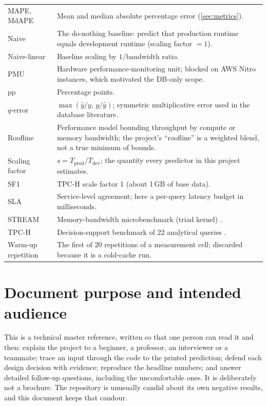 \begin{longtable}{@{}L{2.6cm}L{12.3cm}@{}}
MAPE, MdAPE & Mean and median absolute percentage error (\cref{sec:metrics}).\\
Naive & The do-nothing baseline: predict that production runtime equals development runtime (scaling factor $=1$).\\
Naive-linear & Baseline scaling by $1/\text{bandwidth ratio}$.\\
PMU & Hardware performance-monitoring unit; blocked on AWS Nitro instances, which motivated the DB-only scope.\\
pp & Percentage points.\\
$q$-error & $\max(\hat y/y,\,y/\hat y)$; symmetric multiplicative error used in the database literature.\\
Roofline & Performance model bounding throughput by compute or memory bandwidth; the project's ``roofline'' is a weighted blend, not a true minimum of bounds.\\
Scaling factor & $s = T_{\text{prod}}/T_{\text{dev}}$; the quantity every predictor in this project estimates.\\
SF1 & TPC-H scale factor 1 (about 1\,GB of base data).\\
SLA & Service-level agreement; here a per-query latency budget in milliseconds.\\
STREAM & Memory-bandwidth microbenchmark (triad kernel) \citep{mccalpin:stream}.\\
TPC-H & Decision-support benchmark of 22 analytical queries \citep{tpch:spec}.\\
Warm-up repetition & The first of 20 repetitions of a measurement cell; discarded because it is a cold-cache run.\\
\bottomrule
\end{longtable}
\normalsize

\setcounter{page}{1}
\chapter*{Document purpose and intended audience}

This is a technical master reference, written so that one person can read it and then:
explain the project to a beginner, a professor, an interviewer or a teammate; trace an input through the
code to the printed prediction; defend each design decision with evidence; reproduce the headline
numbers; and answer detailed follow-up questions, including the uncomfortable ones. It is deliberately
not a brochure. The repository is unusually candid about its own negative results, and this document
keeps that candour.

